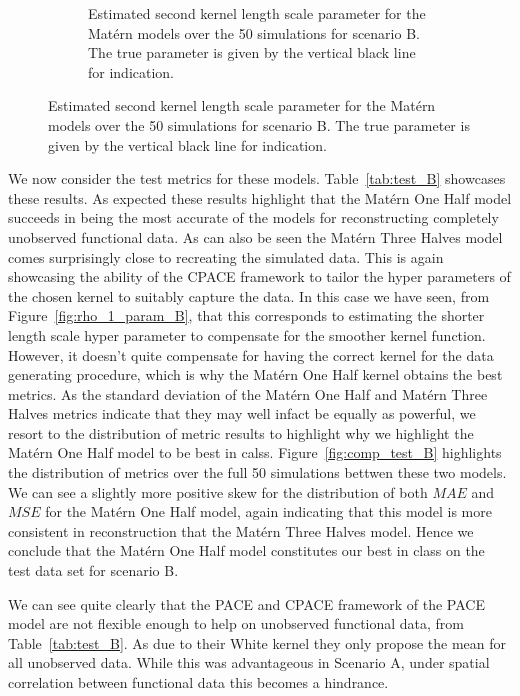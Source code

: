 \begin{figure}
\begin{subfigure}[b]{0.45\textwidth}
		\caption{Estimated second kernel length scale parameter for the Mat\'ern models over the 50 simulations for scenario B. The true parameter is given by the vertical black line for indication.}
		\label{fig:rho_2_param_B}
	\end{subfigure}
\end{figure}

We now consider the test metrics for these models.
Table~\ref{tab:test_B} showcases these results.
As expected these results highlight that the Mat\'ern One Half model succeeds in being the most accurate of the models for reconstructing completely unobserved functional data.
As can also be seen the Mat\'ern Three Halves model comes surprisingly close to recreating the simulated data.
This is again showcasing the ability of the CPACE framework to tailor the hyper parameters of the chosen kernel to suitably capture the data.
In this case we have seen, from Figure~\ref{fig:rho_1_param_B}, that this corresponds to estimating the shorter length scale hyper parameter to compensate for the smoother kernel function.
However, it doesn't quite compensate for having the correct kernel for the data generating procedure, which is why the Mat\'ern One Half kernel obtains the best metrics.
As the standard deviation of the Mat\'ern One Half and Mat\'ern Three Halves metrics indicate that they may well infact be equally as powerful, we resort to the distribution of metric results to highlight why we highlight the Mat\'ern One Half model to be best in calss.
Figure~\ref{fig:comp_test_B} highlights the distribution of metrics over the full 50 simulations bettwen these two models.
We can see a slightly more positive skew for the distribution of both $MAE$ and $MSE$ for the Mat\'ern One Half model, again indicating that this model is more consistent in reconstruction that the Mat\'ern Three Halves model.
Hence we conclude that the Mat\'ern One Half model constitutes our best in class on the test data set for scenario B. 

We can see quite clearly that the PACE and CPACE framework of the PACE model are not flexible enough to help on unobserved functional data, from Table~\ref{tab:test_B}.
As due to their White kernel they only propose the mean for all unobserved data.
While this was advantageous in Scenario A, under spatial correlation between functional data this becomes a hindrance. 

